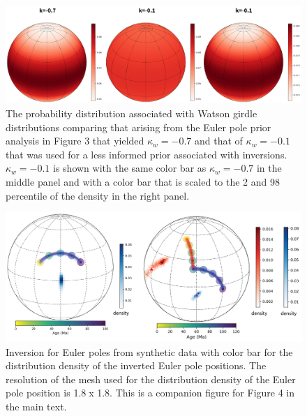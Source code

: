 \documentclass[11pt,letterpaper]{article}
\begin{document}
\begin{figure}[h!]
\noindent\includegraphics[width=\textwidth]{SI_fig_Euler_prior.pdf}
\caption[Watson girdle probability distributions with varying $\kappa_w$]{The probability distribution associated with Watson girdle distributions comparing that arising from the Euler pole prior analysis in Figure 3 that yielded $\kappa_w=-0.7$ and that of $\kappa_w=-0.1$ that was used for a less informed prior associated with inversions.  $\kappa_w=-0.1$ is shown with the same color bar as $\kappa_w=-0.7$ in the middle panel and with a color bar that is scaled to the 2 and 98 percentile of the density in the right panel.}
\label{pdffiguresample}
\end{figure}



\begin{figure}[h!]
\noindent\includegraphics[width=\textwidth]{SI_synthetic_pep.png}
\caption[Companion figure for main text Figure 4 with Euler pole density color bar]{Inversion for Euler poles from synthetic data with color bar for the distribution density of the inverted Euler pole positions. The resolution of the mesh used for the distribution density of the Euler pole position is 1.8\textdegree$\;$x 1.8\textdegree. This is a companion figure for Figure 4 in the main text. }
\label{pdffiguresample}
\end{figure}
\end{document}
